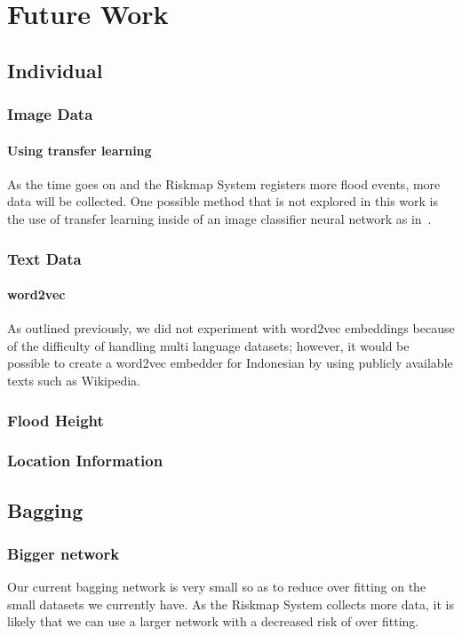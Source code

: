 \chapter{Future Work}

\section{Individual}
\subsection{Image Data}
\subsubsection{Using transfer learning}
As the time goes on and the Riskmap System registers more flood events, 
more data will be collected. One possible method that is not explored in this
work is the use of transfer learning inside of an image classifier neural
network as in~\cite{donahueDeCAFDeepConvolutional2013}.
\subsection{Text Data}
\subsubsection{word2vec}
As outlined previously, we did not experiment with word2vec embeddings because
of the difficulty of handling multi language datasets; however, it would be
possible to create a word2vec embedder for Indonesian by using publicly
available texts such as Wikipedia.
\subsection{Flood Height}
\subsection{Location Information}
\subsubsection{}

\section{Bagging}
\subsection{Bigger network}
Our current bagging network is very small so as to reduce over fitting on the
small datasets we currently have. As the Riskmap System collects more data, it
is likely that we can use a larger network with a decreased risk of over fitting.
